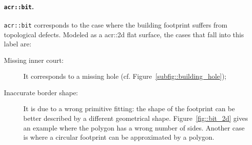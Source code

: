             \paragraph{\texttt{\acrlong*{acr::bit}}.}
                \texttt{\gls{acr::bit}} corresponds to the case where the building footprint suffers from topological defects.
                Modeled as a \gls{acr::2d} flat surface, the cases that fall into this label are:
                \begin{description}
                    \item[Missing inner court:] It corresponds to a missing hole (cf. Figure~\ref{subfig::building_hole});
                    \item[Inaccurate border shape:] It is due to a wrong primitive fitting: the shape of the footprint can be better described by a different geometrical shape.
                            Figure~\ref{fig::bit_2d} gives an example where the polygon has a wrong number of sides.
                            Another case is where a circular footprint can be approximated by a polygon.
                \end{description}

                \begin{figure}[htb]
                    \centering
                \end{figure}

